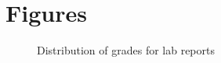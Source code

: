 \documentclass[11pt,a4]{article}
\begin{document}
\section{Figures}

\begin{figure} [h]
\begin{center}
\caption{Distribution of grades for lab reports}
\label{grades_histo}
\end{center}
\end{figure}
\end{document}
